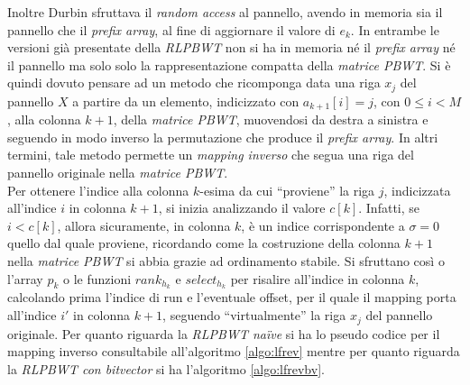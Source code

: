 Inoltre Durbin sfruttava il \textit{random access} al pannello, avendo in
memoria sia il pannello che il \textit{prefix array}, al fine di aggiornare il
valore di $e_k$. In entrambe le versioni già presentate della \textit{RLPBWT}
non si ha in memoria né il \textit{prefix array} né il pannello ma solo solo la
rappresentazione compatta della \textit{matrice PBWT}. Si è quindi dovuto
pensare ad un metodo che ricomponga data una riga $x_j$ del pannello $X$ a
partire da un elemento, indicizzato con $a_{k+1}[i]=j$, con $0\leq i<M$, alla
colonna $k+1$, della 
\textit{matrice PBWT}, muovendosi da destra a sinistra e seguendo in modo
inverso la permutazione che produce il \textit{prefix array}. In altri termini,
tale metodo permette un \textit{mapping inverso} che segua una riga del
pannello originale nella \textit{matrice PBWT}.\\ 
Per ottenere l'indice alla colonna $k$-esima da cui ``proviene'' la riga $j$,
indicizzata all'indice $i$ in
colonna $k+1$, si inizia analizzando il valore $c[k]$. Infatti, se $i<c[k]$,
allora sicuramente, in colonna $k$, è un indice corrispondente a $\sigma=0$
quello dal quale proviene, ricordando come la costruzione della colonna $k+1$
nella \textit{matrice PBWT} si abbia grazie ad ordinamento stabile. Si sfruttano
così o l'array $p_k$ o le funzioni 
$rank_{h_k}$ e $select_{h_k}$ per risalire all'indice in colonna $k$, calcolando
prima l'indice di run e l'eventuale offset, per il quale il mapping porta
all'indice $i'$ in colonna $k+1$, seguendo ``virtualmente'' la riga $x_j$ del
pannello originale. 
Per quanto riguarda la \textit{RLPBWT na\"{i}ve} si ha lo pseudo codice per il
mapping inverso consultabile all'algoritmo \ref{algo:lfrev} mentre per quanto
riguarda la \textit{RLPBWT con bitvector} si ha l'algoritmo
\ref{algo:lfrevbv}.

